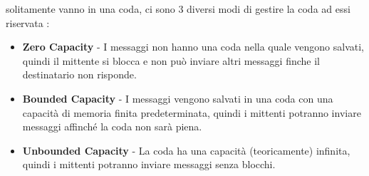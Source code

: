 \documentclass[12pt, letterpaper]{article}
\begin{document}
solitamente vanno in una coda, 
ci sono 3 diversi modi di gestire la coda ad essi riservata :
\begin{itemize}
    \item \textbf{Zero Capacity} - I messaggi non hanno una coda nella quale vengono salvati, quindi il mittente 
    si blocca e non può inviare altri messaggi finche il destinatario non risponde.
    \item \textbf{Bounded Capacity} - I messaggi vengono salvati in una coda con una
     capacità di memoria finita predeterminata, quindi i mittenti potranno inviare messaggi affinché la coda 
     non sarà piena.
     \item \textbf{Unbounded Capacity} - La coda ha una capacità (teoricamente) infinita, quindi i mittenti 
     potranno inviare messaggi senza blocchi.
\end{itemize} 
\begin{figure}[h]
\end{figure}
\end{document}
